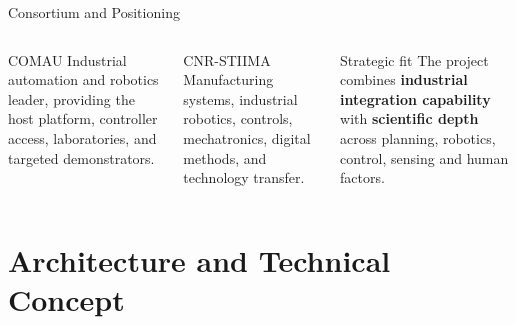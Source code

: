 \documentclass[aspectratio=169,10pt]{beamer}
\begin{document}
\begin{frame}{Consortium and Positioning}

\begin{columns}[T,totalwidth=\textwidth]
\begin{block}{COMAU}
Industrial automation and robotics leader, providing the host platform, controller access, laboratories, and targeted demonstrators.
\end{block}
\begin{block}{CNR-STIIMA}
Manufacturing systems, industrial robotics, controls, mechatronics, digital methods, and technology transfer.
\end{block}
\begin{block}{Strategic fit}
The project combines \textbf{industrial integration capability} with \textbf{scientific depth} across planning, robotics, control, sensing and human factors.
\end{block}
\end{columns}

\end{frame}


\section{Architecture and Technical Concept}
\end{document}
